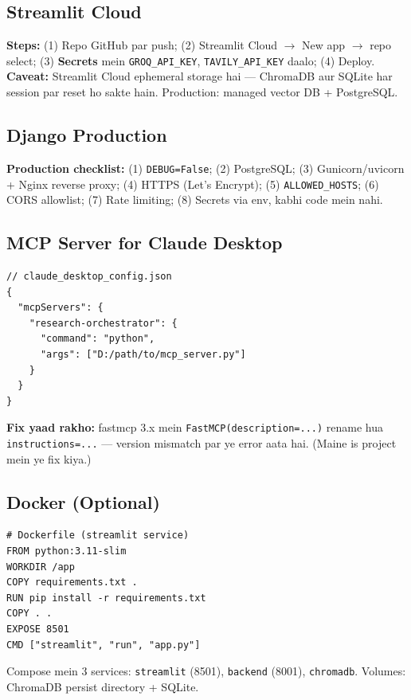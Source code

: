 \subsection{Streamlit Cloud}

\begin{conceptbox}
\textbf{Steps:} (1) Repo GitHub par push; (2) Streamlit Cloud $\rightarrow$ New app $\rightarrow$ repo select; (3) \textbf{Secrets} mein \texttt{GROQ\_API\_KEY}, \texttt{TAVILY\_API\_KEY} daalo; (4) Deploy. \textbf{Caveat:} Streamlit Cloud ephemeral storage hai --- ChromaDB aur SQLite har session par reset ho sakte hain. Production: managed vector DB + PostgreSQL.
\end{conceptbox}

\subsection{Django Production}

\begin{conceptbox}
\textbf{Production checklist:} (1) \texttt{DEBUG=False}; (2) PostgreSQL; (3) Gunicorn/uvicorn + Nginx reverse proxy; (4) HTTPS (Let's Encrypt); (5) \texttt{ALLOWED\_HOSTS}; (6) CORS allowlist; (7) Rate limiting; (8) Secrets via env, kabhi code mein nahi.
\end{conceptbox}

\subsection{MCP Server for Claude Desktop}

\begin{codestorybox}
\begin{lstlisting}[style=jsonstyle]
// claude_desktop_config.json
{
  "mcpServers": {
    "research-orchestrator": {
      "command": "python",
      "args": ["D:/path/to/mcp_server.py"]
    }
  }
}
\end{lstlisting}

\textbf{Fix yaad rakho:} fastmcp 3.x mein \texttt{FastMCP(description=...)} rename hua \texttt{instructions=...} --- version mismatch par ye error aata hai. (Maine is project mein ye fix kiya.)
\end{codestorybox}

\subsection{Docker (Optional)}

\begin{codestorybox}
\begin{lstlisting}[style=bashstyle]
# Dockerfile (streamlit service)
FROM python:3.11-slim
WORKDIR /app
COPY requirements.txt .
RUN pip install -r requirements.txt
COPY . .
EXPOSE 8501
CMD ["streamlit", "run", "app.py"]
\end{lstlisting}

Compose mein 3 services: \texttt{streamlit} (8501), \texttt{backend} (8001), \texttt{chromadb}. Volumes: ChromaDB persist directory + SQLite.
\end{codestorybox}
